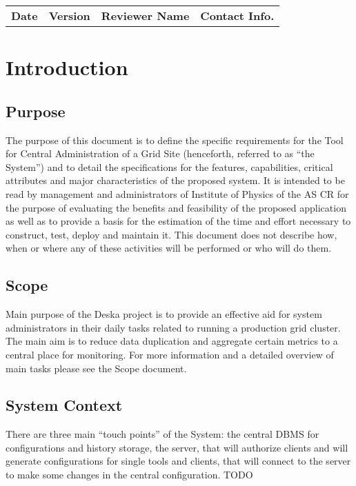 \documentclass[12pt]{article}
\begin{document}
\begin{table}[!h]
	\begin{tabular}{l l l l}
		\textbf{Date} & \textbf{Version} & \textbf{Reviewer Name} & \textbf{Contact Info.} \\
	\end{tabular}
	\label{tab:DocumentApproval}
\end{table}


\newpage

\tableofcontents

\newpage

\section{Introduction}

\subsection{Purpose}
The purpose of this document is to define the specific requirements for the Tool for Central Administration of a Grid Site 
(henceforth, referred to as ``the System'') and to detail the specifications for the features, capabilities, critical attributes 
and major characteristics of the proposed system. It is intended to be read by management and administrators of Institute of 
Physics of the AS CR for the purpose of evaluating the benefits and feasibility of the proposed application as well as to provide 
a basis for the estimation of the time and effort necessary to construct, test, deploy and maintain it. This document does not 
describe how, when or where any of these activities will be performed or who will do them.

\subsection{Scope}
Main purpose of the Deska project is to provide an effective aid for system
administrators in their daily tasks related to running a production grid
cluster.  The main aim is to reduce data duplication and aggregate certain
metrics to a central place for monitoring.  For more information and a detailed
overview of main tasks please see the Scope document.

\subsection{System Context}
There are three main ``touch points'' of the System: the central DBMS for configurations and history storage, the server, 
that will authorize clients and will generate configurations for single tools and clients, that will connect to the server to make some 
changes in the central configuration. TODO
\end{document}

